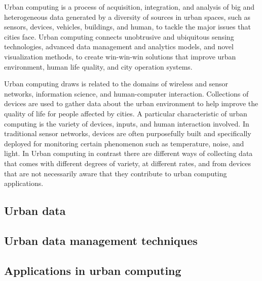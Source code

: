 Urban computing is a process of acquisition, integration, and analysis of big and heterogeneous data generated by a diversity of sources in urban spaces, such as sensors, devices, vehicles, buildings, and human, to tackle the major issues that cities face. Urban computing connects unobtrusive and ubiquitous sensing technologies, advanced data management and analytics models, and novel visualization methods, to create win-win-win solutions that improve urban environment, human life quality, and city operation systems.

Urban computing draws is related to the domains of wireless and sensor networks, information science, and human-computer interaction. Collections of devices are used to gather data about the urban environment to help improve the quality of life for people affected by cities. A particular characteristic of urban computing  is the variety of devices, inputs, and human interaction involved. In traditional sensor networks, devices are often purposefully built and specifically deployed for monitoring certain phenomenon such as temperature, noise, and light. In Urban computing in contrast there are different ways of collecting data that comes with different degrees of variety, at different rates, and from devices that are not necessarily aware that they contribute to urban computing applications.


\subsection{Urban data}

\subsection{Urban data management techniques}

\subsection{Applications in urban computing}
